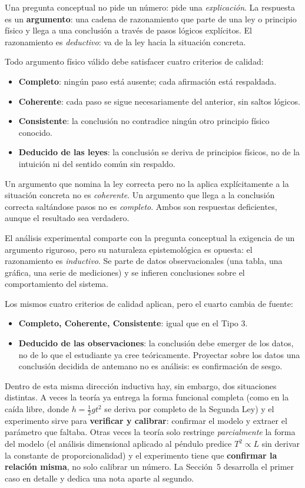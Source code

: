 \documentclass[11pt]{book}
\begin{document}
\medskip
{}
Una pregunta conceptual no pide un número: pide una {\it explicación}. La respuesta es un {\bf argumento}: una cadena de razonamiento que parte de una ley o principio físico y llega a una conclusión a través de pasos lógicos explícitos. El razonamiento es {\it deductivo}: va de la ley hacia la situación concreta.

Todo argumento físico válido debe satisfacer cuatro criterios de calidad:
\begin{itemize}
    \item {\bf Completo}: ningún paso está ausente; cada afirmación está respaldada.
    \item {\bf Coherente}: cada paso se sigue necesariamente del anterior, sin saltos lógicos.
    \item {\bf Consistente}: la conclusión no contradice ningún otro principio físico conocido.
    \item {\bf Deducido de las leyes}: la conclusión se deriva de principios físicos, no de la intuición ni del sentido común sin respaldo.
\end{itemize}

Un argumento que nomina la ley correcta pero no la aplica explícitamente a la situación concreta no es {\it coherente}. Un argumento que llega a la conclusión correcta saltándose pasos no es {\it completo}. Ambos son respuestas deficientes, aunque el resultado sea verdadero.

\medskip
{}
El análisis experimental comparte con la pregunta conceptual la exigencia de un argumento riguroso, pero su naturaleza epistemológica es opuesta: el razonamiento es {\it inductivo}. Se parte de datos observacionales (una tabla, una gráfica, una serie de mediciones) y se infieren conclusiones sobre el comportamiento del sistema.

Los mismos cuatro criterios de calidad aplican, pero el cuarto cambia de fuente:
\begin{itemize}
    \item {\bf Completo, Coherente, Consistente}: igual que en el Tipo 3.
    \item {\bf Deducido de las observaciones}: la conclusión debe emerger de los datos, no de lo que el estudiante ya cree teóricamente. Proyectar sobre los datos una conclusión decidida de antemano no es análisis: es confirmación de sesgo.
\end{itemize}

Dentro de esta misma dirección inductiva hay, sin embargo, dos situaciones distintas. A veces la teoría ya entrega la forma funcional completa (como en la caída libre, donde $h=\tfrac{1}{2}gt^2$ se deriva por completo de la Segunda Ley) y el experimento sirve para {\bf verificar y calibrar}: confirmar el modelo y extraer el parámetro que faltaba. Otras veces la teoría solo restringe {\it parcialmente} la forma del modelo (el análisis dimensional aplicado al péndulo predice $T^2 \propto L$ sin derivar la constante de proporcionalidad) y el experimento tiene que {\bf confirmar la relación misma}, no solo calibrar un número. La Sección~5 desarrolla el primer caso en detalle y dedica una nota aparte al segundo.
\end{document}
